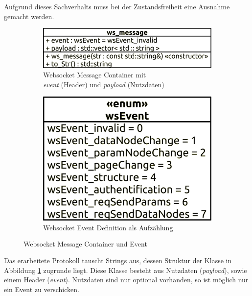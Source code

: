 Aufgrund dieses Sachverhalts muss bei der Zustandsfreiheit eine Ausnahme gemacht werden.
\begin{figure}[ht]
  \centering
  \begin{subfigure}[b]{0.601833561\textwidth}
    \includegraphics[width=\textwidth]{content/hauptteil/systemEntwurf/res/protokoll/ws_Message.pdf}
    \caption{Websocket Message Container mit \\ \emph{event} (Header) und \emph{payload} (Nutzdaten)}
    \label{fig:CDWME:ws_message}
  \end{subfigure}
  \hfill
  \begin{subfigure}[b]{0.388166439\textwidth}
    \includegraphics[width=\textwidth]{content/hauptteil/systemEntwurf/res/protokoll/wsEvent.pdf}
    \caption{Websocket Event Definition als Aufzählung}
    \label{fig:CDWME:wsEvent}
  \end{subfigure}
  \caption[Websocket Message Container und Event]{Websocket Message Container und Event}
  \label{fig:CDWME}
\end{figure}
Das erarbeitete Protokoll tauscht Strings aus, dessen Struktur der Klasse in Abbildung \ref{fig:CDWME:ws_message} zugrunde liegt.
Diese Klasse besteht aus Nutzdaten (\emph{payload}), sowie einem Header (\emph{event}).
Nutzdaten sind nur optional vorhanden, so ist möglich nur ein Event zu verschicken.
